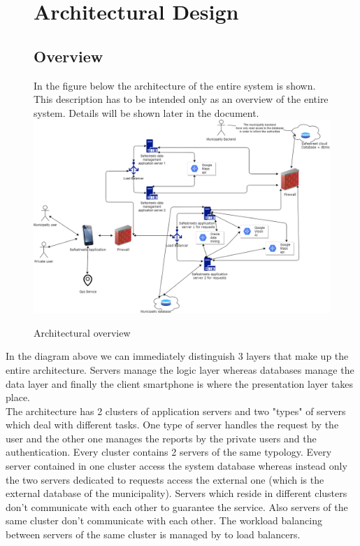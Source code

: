 \documentclass[titlepage]{article}
\begin{document}
\begin{figure}[h]
\section{Architectural Design}
	\subsection{Overview}
In the figure below the architecture of the entire system is shown. This description has to be intended only as an overview of the entire system. Details will be shown later in the document.
	\includegraphics[scale=0.419]{Diagrams/overview.png}
	\caption{Architectural overview}
\end{figure}
\FloatBarrier
In the diagram above we can immediately distinguish 3 layers that make up the entire architecture. Servers manage the logic layer whereas databases manage the data layer and finally the client smartphone is where the presentation layer takes place. \\
The architecture has 2 clusters of application servers and two "types" of servers which deal with different tasks. One type of server handles the request by the user and the other one manages the reports by the private users and the authentication. Every cluster contains 2 servers of the same typology. Every server contained in one cluster access the system database whereas instead only the two servers dedicated to requests access the external one (which is the external database of the municipality). Servers which reside in different clusters don't communicate with each other to guarantee the service. Also servers of the same cluster don't communicate with each other. The workload balancing between servers of the same cluster is managed by to load balancers.\\
\end{document}
